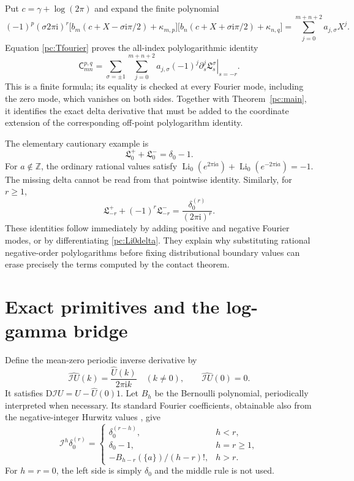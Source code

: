 \documentclass[11pt,a4paper]{article}
\numberwithin{equation}{section}
\theoremstyle{definition}
\newcommand{\Z}{\mathbb Z}
\newcommand{\ii}{\mathrm i}
\newcommand{\D}{\mathrm D}
\newcommand{\Li}{\operatorname{Li}}
\newcommand{\Cf}{\mathsf C}
\newcommand{\If}{\mathcal I}
\begin{document}
Put $c=\gamma+\log(2\pi)$ and expand the finite polynomial
\begin{equation}\label{pc:polylogpolynomial}
 (-1)^p(\sigma2\pi\ii)^r
 \bigl[b_m(c+X-\sigma\ii\pi/2)+\kappa_{m,p}\bigr]
 \bigl[b_n(c+X+\sigma\ii\pi/2)+\kappa_{n,q}\bigr]
 =\sum_{j=0}^{m+n+2}a_{j,\sigma}X^j.
\end{equation}
Equation \eqref{pc:Tfourier} proves the all-index polylogarithmic identity
\begin{equation}\label{pc:polylogidentity}
 \Cf_{mn}^{p,q}=
 \sum_{\sigma=\pm1}\sum_{j=0}^{m+n+2}
 a_{j,\sigma}(-1)^j
 \left.\partial_s^j\mathfrak L_s^\sigma\right|_{s=-r}.
\end{equation}
This is a finite formula; its equality is checked at every Fourier mode, including the zero mode, which vanishes on both sides. Together with Theorem~\ref{pc:main}, it identifies the exact delta derivative that must be added to the coordinate extension of the corresponding off-point polylogarithm identity.

The elementary cautionary example is
\begin{equation}\label{pc:Li0delta}
 \mathfrak L_0^++\mathfrak L_0^-=\delta_0-1.
\end{equation}
For $a\notin\Z$, the ordinary rational values satisfy
$\Li_0(e^{2\pi\ii a})+\Li_0(e^{-2\pi\ii a})=-1$. The missing delta cannot be read from that pointwise identity. Similarly, for $r\ge1$,
\begin{equation}\label{pc:Lirdelta}
 \mathfrak L_{-r}^++(-1)^r\mathfrak L_{-r}^-
 =\frac{\delta_0^{(r)}}{(2\pi\ii)^r}.
\end{equation}
These identities follow immediately by adding positive and negative Fourier modes, or by differentiating \eqref{pc:Li0delta}. They explain why substituting rational negative-order polylogarithms before fixing distributional boundary values can erase precisely the terms computed by the contact theorem.

\section{Exact primitives and the log-gamma bridge}\label{pc:primitives}
Define the mean-zero periodic inverse derivative by
\[
 \widehat{\If U}(k)=\frac{\widehat U(k)}{2\pi\ii k}\quad(k\ne0),
 \qquad\widehat{\If U}(0)=0.
\]
It satisfies $\D\If U=U-\widehat U(0)1$. Let $B_h$ be the Bernoulli polynomial, periodically interpreted when necessary. Its standard Fourier coefficients, obtainable also from the negative-integer Hurwitz values \cite{pc:DLMFhurwitz}, give
\begin{equation}\label{pc:primitivecontact}
 \If^h\delta_0^{(r)}=
 \begin{cases}
 \delta_0^{(r-h)},&h<r,\\
 \delta_0-1,&h=r\ge1,\\
 -B_{h-r}(\{a\})/(h-r)!,&h>r.
 \end{cases}
\end{equation}
For $h=r=0$, the left side is simply $\delta_0$ and the middle rule is not used.
\end{document}
